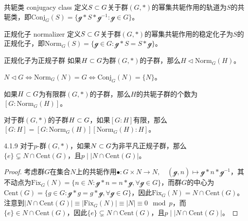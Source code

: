 \begin{definition}{共轭类 conjugacy class}
	定义$S\subset G$关于群$(G,*)$的幂集共轭作用的轨道为$S$的共轭类，即$\mathrm{Conj}_G(S)=\{ \mathcal{g}*S*\mathcal{g}^{-1}:\mathcal{g}\in G \}$。
\end{definition}

\begin{definition}{正规化子 normalizer}
	定义$S\subset G$关于群$(G,*)$的幂集共轭作用的稳定化子为$S$的正规化子，即$\mathrm{Norm}_G(S)=\{ \mathcal{g}\in G:\mathcal{g}*S=S*\mathcal{g} \}$。
\end{definition}

\begin{proposition}{正规化子为正规子群}
	如果$H\subset G$为群$(G,*)$的子群，那么$H\lhd\mathrm{Norm}_G(H)$。
\end{proposition}

\begin{proposition}
	$N\lhd G\iff \mathrm{Norm}_G(N)=G\iff \mathrm{Conj}_G(N)=\{ N \}$。
\end{proposition}

\begin{proposition}
	如果$H\subset G$为有限群$(G,*)$的子群，那么$H$的共轭子群的个数为$[G:\mathrm{Norm}_G(H)]$。
\end{proposition}

\begin{corollary}
	对于群$(G,*)$的子群$H\subset G$，如果$[G:H]$有限，那么$[G:H]=[G:\mathrm{Norm}_G(H)][\mathrm{Norm}_G(H):H]$。
\end{corollary}

\begin{proposition}{}{4.1.9}
	对于$p$-群$(G,*)$，如果$N\subset G$为非平凡正规子群，那么$\{e\}\subsetneq N\cap\mathrm{Cent}(G)$，且$p\mid |N\cap\mathrm{Cent}(G)|$。
\end{proposition}

\begin{proof}
	考虑群$G$在集合$N$上的共轭作用$\bullet:G\times N\to N,\quad (\mathcal{g},n)\mapsto \mathcal{g}*n*\mathcal{g}^{-1}$，其不动点为$\mathrm{Fix}_G(N)=\{ n\in N:\mathcal{g}*n=n*\mathcal{g},\forall\mathcal{g}\in G \}$，而群$G$的中心为$\mathrm{Cent}(G)=\{ g\in G:\mathcal{g}*g=g*\mathcal{g},\forall \mathcal{g}\in G \}$，因此$\mathrm{Fix}_G(N)=N\cap\mathrm{Cent}(G)$。注意到$|N\cap\mathrm{Cent}(G)|\equiv|\mathrm{Fix}_G(N)|\equiv |N|\equiv 0\mod p$，而$\{e\}\in N\cap\mathrm{Cent}(G)$，因此$\{e\}\subsetneq N\cap\mathrm{Cent}(G)$，且$p\mid |N\cap\mathrm{Cent}(G)|$。
\end{proof}


